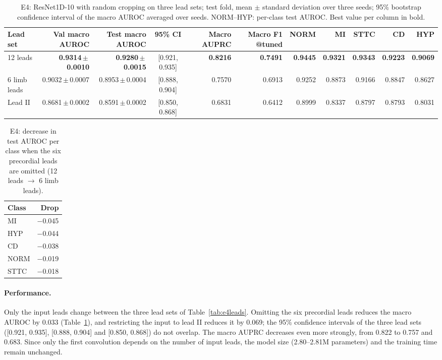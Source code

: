 \documentclass{article}
\begin{document}
\begin{table}[htb]
  \caption{E4: ResNet1D-10 with random cropping on three lead sets; test fold, mean $\pm$ standard deviation over three seeds; 95\% bootstrap confidence interval of the macro AUROC averaged over seeds. NORM--HYP: per-class test AUROC. Best value per column in bold.}
  \label{tab:e4}
  \centering\footnotesize
  \begin{adjustbox}{max width=\linewidth}
  \begin{tabular}{lrrcrrrrrrr}
    \toprule
    Lead set & Val macro AUROC & Test macro AUROC & 95\% CI & Macro AUPRC & Macro F1 @tuned & NORM & MI & STTC & CD & HYP \\
    \midrule
    12 leads & \textbf{0.9314\,$\pm$\,0.0010} & \textbf{0.9280\,$\pm$\,0.0015} & [0.921, 0.935] & \textbf{0.8216} & \textbf{0.7491} & \textbf{0.9445} & \textbf{0.9321} & \textbf{0.9343} & \textbf{0.9223} & \textbf{0.9069} \\
    6 limb leads & 0.9032\,$\pm$\,0.0007 & 0.8953\,$\pm$\,0.0004 & [0.888, 0.904] & 0.7570 & 0.6913 & 0.9252 & 0.8873 & 0.9166 & 0.8847 & 0.8627 \\
    Lead II & 0.8681\,$\pm$\,0.0002 & 0.8591\,$\pm$\,0.0002 & [0.850, 0.868] & 0.6831 & 0.6412 & 0.8999 & 0.8337 & 0.8797 & 0.8793 & 0.8031 \\
    \bottomrule
  \end{tabular}
  \end{adjustbox}
\end{table}

\begin{table}[htb]
  \caption{E4: decrease in test AUROC per class when the six precordial leads are omitted (12 leads $\to$ 6 limb leads).}
  \label{tab:e4drop}
  \centering\footnotesize
  \begin{adjustbox}{max width=\linewidth}
  \begin{tabular}{lr}
    \toprule
    Class & Drop \\
    \midrule
    MI & $-$0.045 \\
    HYP & $-$0.044 \\
    CD & $-$0.038 \\
    NORM & $-$0.019 \\
    STTC & $-$0.018 \\
    \bottomrule
  \end{tabular}
  \end{adjustbox}
\end{table}


\paragraph{Performance.} Only the input leads change between the three lead sets of Table~\ref{tab:e4leads}. Omitting the six precordial leads reduces the macro AUROC by 0.033 (Table~\ref{tab:e4}), and restricting the input to lead II reduces it by 0.069; the 95\% confidence intervals of the three lead sets ([0.921, 0.935], [0.888, 0.904] and [0.850, 0.868]) do not overlap. The macro AUPRC decreases even more strongly, from 0.822 to 0.757 and 0.683. Since only the first convolution depends on the number of input leads, the model size (2.80--2.81M parameters) and the training time remain unchanged.
\end{document}
